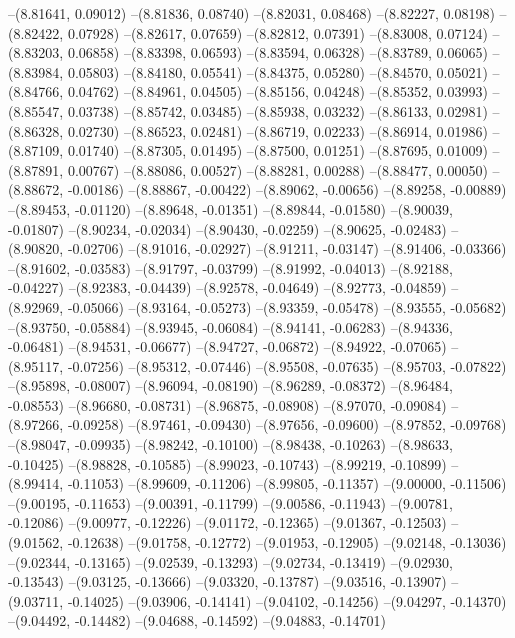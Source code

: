 --(8.81641, 0.09012)
--(8.81836, 0.08740)
--(8.82031, 0.08468)
--(8.82227, 0.08198)
--(8.82422, 0.07928)
--(8.82617, 0.07659)
--(8.82812, 0.07391)
--(8.83008, 0.07124)
--(8.83203, 0.06858)
--(8.83398, 0.06593)
--(8.83594, 0.06328)
--(8.83789, 0.06065)
--(8.83984, 0.05803)
--(8.84180, 0.05541)
--(8.84375, 0.05280)
--(8.84570, 0.05021)
--(8.84766, 0.04762)
--(8.84961, 0.04505)
--(8.85156, 0.04248)
--(8.85352, 0.03993)
--(8.85547, 0.03738)
--(8.85742, 0.03485)
--(8.85938, 0.03232)
--(8.86133, 0.02981)
--(8.86328, 0.02730)
--(8.86523, 0.02481)
--(8.86719, 0.02233)
--(8.86914, 0.01986)
--(8.87109, 0.01740)
--(8.87305, 0.01495)
--(8.87500, 0.01251)
--(8.87695, 0.01009)
--(8.87891, 0.00767)
--(8.88086, 0.00527)
--(8.88281, 0.00288)
--(8.88477, 0.00050)
--(8.88672, -0.00186)
--(8.88867, -0.00422)
--(8.89062, -0.00656)
--(8.89258, -0.00889)
--(8.89453, -0.01120)
--(8.89648, -0.01351)
--(8.89844, -0.01580)
--(8.90039, -0.01807)
--(8.90234, -0.02034)
--(8.90430, -0.02259)
--(8.90625, -0.02483)
--(8.90820, -0.02706)
--(8.91016, -0.02927)
--(8.91211, -0.03147)
--(8.91406, -0.03366)
--(8.91602, -0.03583)
--(8.91797, -0.03799)
--(8.91992, -0.04013)
--(8.92188, -0.04227)
--(8.92383, -0.04439)
--(8.92578, -0.04649)
--(8.92773, -0.04859)
--(8.92969, -0.05066)
--(8.93164, -0.05273)
--(8.93359, -0.05478)
--(8.93555, -0.05682)
--(8.93750, -0.05884)
--(8.93945, -0.06084)
--(8.94141, -0.06283)
--(8.94336, -0.06481)
--(8.94531, -0.06677)
--(8.94727, -0.06872)
--(8.94922, -0.07065)
--(8.95117, -0.07256)
--(8.95312, -0.07446)
--(8.95508, -0.07635)
--(8.95703, -0.07822)
--(8.95898, -0.08007)
--(8.96094, -0.08190)
--(8.96289, -0.08372)
--(8.96484, -0.08553)
--(8.96680, -0.08731)
--(8.96875, -0.08908)
--(8.97070, -0.09084)
--(8.97266, -0.09258)
--(8.97461, -0.09430)
--(8.97656, -0.09600)
--(8.97852, -0.09768)
--(8.98047, -0.09935)
--(8.98242, -0.10100)
--(8.98438, -0.10263)
--(8.98633, -0.10425)
--(8.98828, -0.10585)
--(8.99023, -0.10743)
--(8.99219, -0.10899)
--(8.99414, -0.11053)
--(8.99609, -0.11206)
--(8.99805, -0.11357)
--(9.00000, -0.11506)
--(9.00195, -0.11653)
--(9.00391, -0.11799)
--(9.00586, -0.11943)
--(9.00781, -0.12086)
--(9.00977, -0.12226)
--(9.01172, -0.12365)
--(9.01367, -0.12503)
--(9.01562, -0.12638)
--(9.01758, -0.12772)
--(9.01953, -0.12905)
--(9.02148, -0.13036)
--(9.02344, -0.13165)
--(9.02539, -0.13293)
--(9.02734, -0.13419)
--(9.02930, -0.13543)
--(9.03125, -0.13666)
--(9.03320, -0.13787)
--(9.03516, -0.13907)
--(9.03711, -0.14025)
--(9.03906, -0.14141)
--(9.04102, -0.14256)
--(9.04297, -0.14370)
--(9.04492, -0.14482)
--(9.04688, -0.14592)
--(9.04883, -0.14701)
